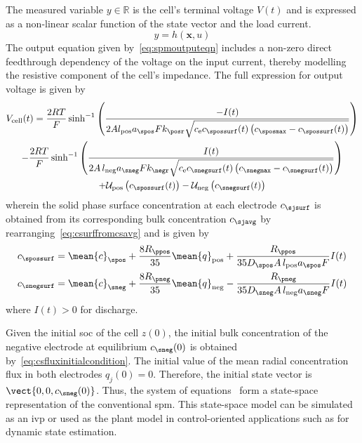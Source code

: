 The measured variable $y ∈ \mathbb{R}$ is the cell's terminal voltage
$V(t)$ and is expressed as a non-linear  scalar function of the state vector and
the load current.
\begin{equation}\label{eq:spmoutputeqn}
    y = h(\mathbf{x},u)
\end{equation}
The output  equation given by~\cref{eq:spmoutputeqn} includes  a non-zero direct
feedthrough dependency  of the voltage  on the input current,  thereby modelling
the resistive component of the cell's  impedance. The full expression for output
voltage is given by
\begin{multline}
    V_\text{cell}(t) = \frac{2 R T}{F }\sinh^{-1} \left( \frac{- I(t)}{2 A
    l_\text{pos} a_\spos F k_\posr \sqrt{c_\text{e} c_\spossurf(t)
    \left(c_\sposmax - c_\spossurf(t)\right)}}\right) \\
    - \frac{2 R T}{F }\sinh^{-1} \left( \frac{I(t)}{2 A \, l_\text{neg} a_\sneg F
    k_\negr \sqrt{c_\text{e} c_\snegsurf(t) \left(c_\snegmax - c_\snegsurf(t)\right)}}\right) \\
    + \mathcal{U}_\text{pos}\left(c_\spossurf(t)\right) -
    \mathcal{U}_\text{neg}\left(c_\snegsurf(t)\right)
\end{multline}
wherein  the solid  phase surface  concentration at  each electrode  $c_\sjsurf$
is   obtained  from   its   corresponding  bulk   concentration  $c_\sjavg$   by
rearranging~\cref{eq:csurffromcsavg} and is given by
\begin{align}
    c_\spossurf &= \mean{c}_\spos  + \frac{8R_\ppos}{35} \mean{q}_\text{pos} +\frac{R_\ppos}{35 D_\spos A \, l_\text{pos} a_\spos F} I(t) \\
    c_\snegsurf &= \mean{c}_\sneg  + \frac{8R_\pneg}{35} \mean{q}_\text{neg} -\frac{R_\pneg}{35 D_\sneg A \, l_\text{neg} a_\sneg F} I(t)\label{eq:csurfnegfromcavgneg}
\end{align}
where $I(t) > 0 $ for discharge.

Given   the  initial   \gls{soc}  of   the   cell  $z(0)$,   the  initial   bulk
concentration  of   the  negative  electrode  at   equilibrium  $c_\sneg(0)$  is
obtained  by~\cref{eq:csfluxinitialcondition}. The  initial  value  of the  mean
radial  concentration  flux   in  both  electrodes  $q_j(0)   =  0$.  Therefore,
the  initial  state  vector  is $\vect{0,0,c_\sneg(0)}$.  Thus,  the  system  of
equations~  form  a
state-space representation of the conventional \gls{spm}. This state-space model
can be simulated as an \gls{ivp} or  used as the plant model in control-oriented
applications such as for dynamic state estimation.
